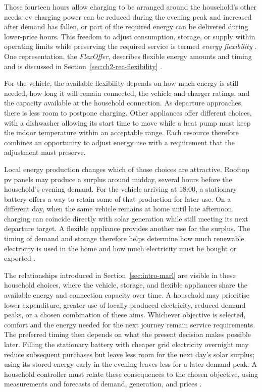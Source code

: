 Those fourteen hours allow charging to be arranged around the household's other needs. \gls{ev} charging power can be reduced during the evening peak and increased after demand has fallen, or part of the required energy can be delivered during lower-price hours. This freedom to adjust consumption, storage, or supply within operating limits while preserving the required service is termed \emph{energy flexibility} \parencite{hussain2023flexibility}. One representation, the \emph{FlexOffer}, describes flexible energy amounts and timing and is discussed in Section~\ref{sec:ch2-rec-flexibility} \parencite{siksnys2019flexoffers}.

For the vehicle, the available flexibility depends on how much energy is still needed, how long it will remain connected, the vehicle and charger ratings, and the capacity available at the household connection. As departure approaches, there is less room to postpone charging. Other appliances offer different choices, with a dishwasher allowing its start time to move while a heat pump must keep the indoor temperature within an acceptable range. Each resource therefore combines an opportunity to adjust energy use with a requirement that the adjustment must preserve.

Local energy production changes which of those choices are attractive. Rooftop \gls{pv} panels may produce a surplus around midday, several hours before the household's evening demand. For the vehicle arriving at 18:00, a stationary battery offers a way to retain some of that production for later use. On a different day, when the same vehicle remains at home until late afternoon, charging can coincide directly with solar generation while still meeting its next departure target. A flexible appliance provides another use for the surplus. The timing of demand and storage therefore helps determine how much renewable electricity is used in the home and how much electricity must be bought or exported \parencite{hussain2023flexibility,hodge2017charging}.

The relationships introduced in Section~\ref{sec:intro-marl} are visible in these household choices, where the vehicle, storage, and flexible appliances share the available energy and connection capacity over time. A household may prioritise lower expenditure, greater use of locally produced electricity, reduced demand peaks, or a chosen combination of these aims. Whichever objective is selected, comfort and the energy needed for the next journey remain service requirements. The preferred timing then depends on what the present decision makes possible later. Filling the stationary battery with cheaper grid electricity overnight may reduce subsequent purchases but leave less room for the next day's solar surplus; using its stored energy early in the evening leaves less for a later demand peak. A household controller must relate these consequences to the chosen objective, using measurements and forecasts of demand, generation, and prices \parencite{chen2022rlpower}.

